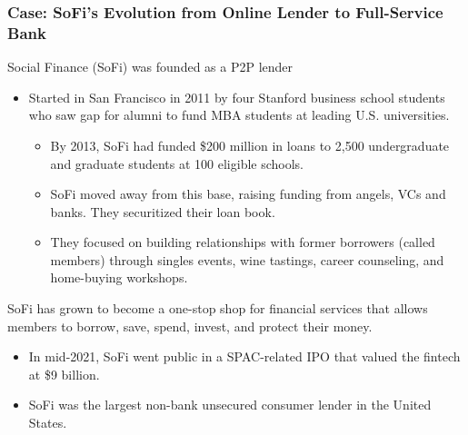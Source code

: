 \documentclass[aspectratio=169,xcolor=dvipsnames]{beamer}
\begin{document}
\begin{frame}
\frametitle{Case: SoFi’s Evolution from Online Lender to Full-Service Bank}

\vspace{-2mm}
Social Finance (SoFi) was founded as a P2P lender

\begin{itemize}
    \item Started in San Francisco in 2011 by four Stanford business school students who saw gap for alumni to fund MBA students at leading U.S. universities.
    \begin{itemize}
        \item By 2013, SoFi had funded \$200 million in loans to 2,500 undergraduate and graduate students at 100 eligible schools.
        \item SoFi moved away from this base, raising funding from  angels, VCs and banks. They securitized their loan book.
        \item They focused on building relationships with former borrowers (called members) through singles events, wine tastings, career counseling, and home-buying workshops.
    \end{itemize}
\end{itemize}

\medskip 

SoFi has grown to become a one-stop shop for financial services that allows members to borrow, save, spend, invest, and protect their money.
\begin{itemize}
    \item In mid-2021, SoFi went public in a SPAC-related IPO that valued the fintech at \$9 billion.
    \item SoFi was the largest non-bank unsecured consumer lender in the United States.
\end{itemize}



\end{frame} 




\end{document}
